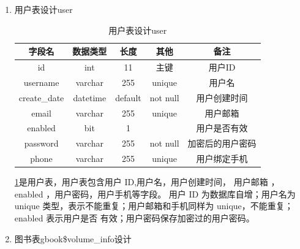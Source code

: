 \begin{enumerate}
	\item 用户表设计user
	
	\begin{table}[h]
		\centering
		\caption{用户表设计user}
		\label{user_table}
		\begin{tabular}{ccccc}
			\toprule
			\textbf{字段名} & \textbf{数据类型} & \textbf{长度} & \textbf{其他}  & \textbf{备注} \\
			\midrule
			id  & int & 11 & 主键 & 用户ID \\
			username & varchar & 255 & unique & 用户名 \\
			create\_date & datetime & default & not null & 用户创建时间 \\
			email & varchar & 255 & unique & 用户邮箱 \\
			enabled & bit & 1 &  & 用户是否有效 \\
			password & varchar & 255 & not null & 加密后的用户密码 \\
			phone & varchar & 255 & unique & 用户绑定手机 \\
			\bottomrule
		\end{tabular}
	\end{table}

	\cref{user_table}是用户表，用户表包含用户 ID,用户名，用户创建时间， 用户邮箱 ， enabled ，用户密码，用户手机等字段。
	用户 ID 为数据库自增；用户名为 unique 类型，表示不能重复；用户邮箱和手机同样为 unique，不能重复；enabled 表示用户是否
	有效；用户密码保存加密过的用户密码。

	\item 图书表gbook\$volume\_info设计
	

\end{enumerate}
